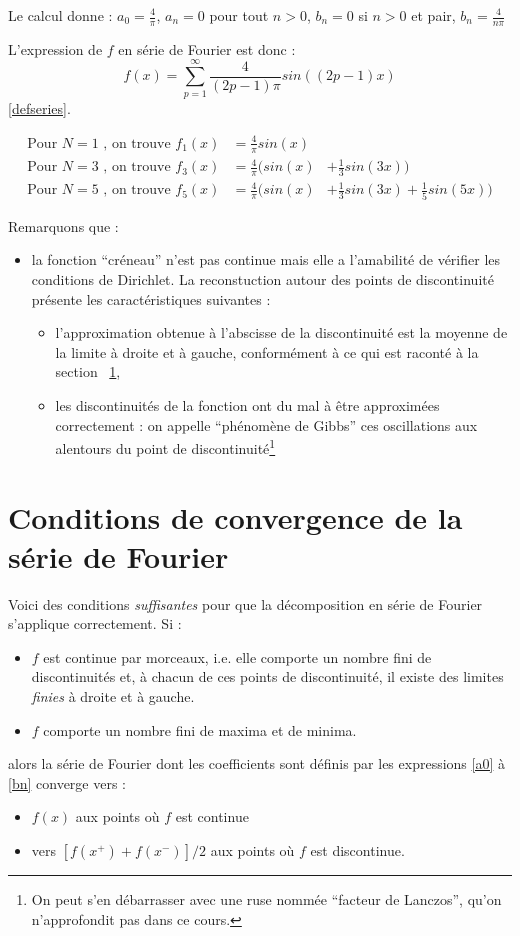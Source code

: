Le calcul donne : $a_0=\frac{4}{\pi}$, $a_n=0$ pour tout $n>0$, $b_n=0$ si $n>0$ et pair, $b_n=\frac{4}{n\pi}$

L'expression de $f$ en série de Fourier est donc :
\begin{equation}
f(x)=\sum_{p=1}^\infty \frac{4}{(2p-1)\pi}sin((2p-1)x)
\end{equation}
\ref{defseries}.

\begin{eqnarray}
\text{Pour $N=1$ , on trouve } f_1(x) & =\frac{4}{\pi}sin(x) & \\
\text{Pour $N=3$ , on trouve } f_3(x) & =\frac{4}{\pi}\Big(sin(x) & +\frac{1}{3}sin(3x) \Big) \\
\text{Pour $N=5$  , on trouve } f_5(x) & =\frac{4}{\pi}\Big(sin(x)& +\frac{1}{3}sin(3x)+\frac{1}{5}sin(5x)\Big) 
\end{eqnarray}


Remarquons que :
\begin{itemize}
\item la fonction ``créneau'' n'est pas continue mais elle a l'amabilité
  de vérifier les conditions de Dirichlet. La reconstuction autour des points de discontinuité présente les caractéristiques suivantes :
\begin{itemize}
\item l'approximation obtenue à l'abscisse de la discontinuité est la
  moyenne de la limite à droite et à gauche, conformément à ce qui est
  raconté à la section ~\ref{sec_convergence},
\item les discontinuités de la fonction ont du mal à être
  approximées correctement : on appelle ``phénomène de Gibbs'' ces oscillations aux
  alentours du point de discontinuité\footnote{On peut s'en
  débarrasser avec une ruse nommée ``facteur de Lanczos'', qu'on n'approfondit pas dans ce cours.}
\end{itemize}
\end{itemize} 


\section{Conditions de convergence de la série de Fourier}
\label{sec_convergence}
Voici des conditions \emph{suffisantes} pour que la décomposition en série de
Fourier s'applique correctement. Si :
\begin{itemize}
\item $f$ est continue par morceaux, i.e. elle comporte un nombre fini
  de discontinuités et, à chacun de ces points de discontinuité, il
  existe des limites \emph{finies} à droite et à gauche.
\item $f$ comporte un nombre fini de maxima et de minima.
\end{itemize}
alors la série de Fourier dont les coefficients sont définis par les
expressions \ref{a0} à \ref{bn} converge vers :
\begin{itemize}
\item $f(x)$ aux points où $f$ est continue 
\item vers $[f(x^+)+f(x^-)]/2$ aux points où $f$ est discontinue.
\end{itemize}

